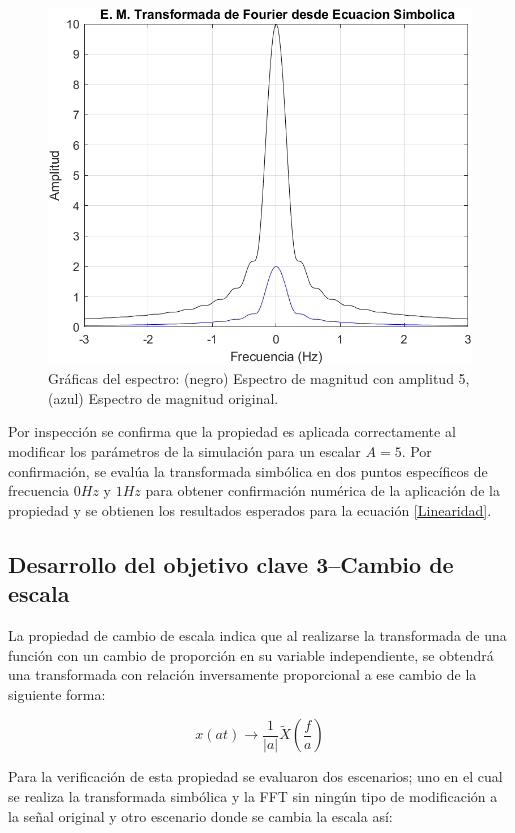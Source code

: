 \documentclass[11pt,letterpaper,twocolumn]{article}
\begin{document}
        \begin{figure}[H]
            \centering 
            \includegraphics[width=0.5\linewidth]{img/Proplinearidad.png}
            \caption{Gráficas del espectro: (negro)  
                     Espectro de magnitud con amplitud 5, (azul) Espectro de magnitud original.}
             \label{P2}
        \end{figure}
        \vspace{-5mm}    
            
        Por inspección se confirma que la propiedad es aplicada correctamente al modificar los parámetros de la simulación para un escalar $A=5$. Por confirmación, se evalúa la transformada simbólica en dos puntos específicos de frecuencia $0 Hz$ y $1 Hz$ para obtener confirmación numérica de la aplicación de la propiedad y se obtienen los resultados esperados para la ecuación \ref{Linearidad}.
        
    \subsection{Desarrollo del objetivo clave 3--Cambio de escala}
        La propiedad de cambio de escala indica que al realizarse la transformada de una función con un cambio de proporción en su variable independiente, se obtendrá una transformada con relación inversamente proporcional a ese cambio de la siguiente forma: 
        
        \begin{equation}
            x(at)\rightarrow \frac{1}{\left | a \right |} \tilde X(\frac{f}{a})
            \label{Escala}
        \end{equation}
         
        Para la verificación de esta propiedad se evaluaron dos escenarios; uno en el cual se realiza la transformada simbólica y la FFT sin ningún tipo de modificación a la señal original y otro escenario donde se cambia la escala así:
        
\end{document}
